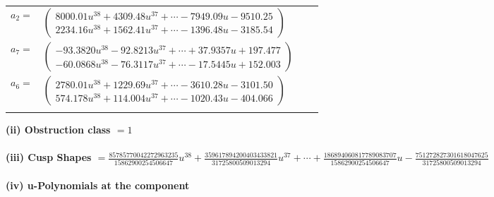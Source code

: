 \documentclass[1p]{elsarticle_modified}
\theoremstyle{definition}
\begin{document}
\begin{tabular}{m{7pt} m{180pt} m{7pt} m{180pt} }
\flushright $a_{2}=$&$\begin{pmatrix}8000.01 u^{38}+4309.48 u^{37}+\cdots-7949.09 u-9510.25\\2234.16 u^{38}+1562.41 u^{37}+\cdots-1396.48 u-3185.54\end{pmatrix}$ \\
\flushright $a_{7}=$&$\begin{pmatrix}-93.3820 u^{38}-92.8213 u^{37}+\cdots+37.9357 u+197.477\\-60.0868 u^{38}-76.3117 u^{37}+\cdots-17.5445 u+152.003\end{pmatrix}$ \\
\flushright $a_{6}=$&$\begin{pmatrix}2780.01 u^{38}+1229.69 u^{37}+\cdots-3610.28 u-3101.50\\574.178 u^{38}+114.004 u^{37}+\cdots-1020.43 u-404.066\end{pmatrix}$\\&\end{tabular}
\flushleft \textbf{(ii) Obstruction class $= 1$}\\~\\
\flushleft \textbf{(iii) Cusp Shapes $= \frac{85785770042272963235}{15862900254506647} u^{38}+\frac{359617894200403433821}{31725800509013294} u^{37}+\cdots+\frac{186894060817789083707}{15862900254506647} u-\frac{751272827301618047625}{31725800509013294}$}\\~\\
\newpage\renewcommand{\arraystretch}{1}
\flushleft \textbf{(iv) u-Polynomials at the component}\newline \\
\end{document}
